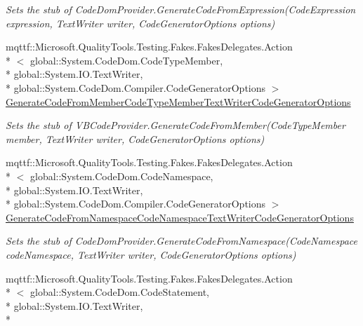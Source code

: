 \begin{DoxyCompactItemize}
\begin{DoxyCompactList}\small\item\em Sets the stub of Code\-Dom\-Provider.\-Generate\-Code\-From\-Expression(\-Code\-Expression expression, Text\-Writer writer, Code\-Generator\-Options options)\end{DoxyCompactList}\item 
mqttf\-::\-Microsoft.\-Quality\-Tools.\-Testing.\-Fakes.\-Fakes\-Delegates.\-Action\\*
$<$ global\-::\-System.\-Code\-Dom.\-Code\-Type\-Member, \\*
global\-::\-System.\-I\-O.\-Text\-Writer, \\*
global\-::\-System.\-Code\-Dom.\-Compiler.\-Code\-Generator\-Options $>$ \hyperlink{class_microsoft_1_1_visual_basic_1_1_fakes_1_1_stub_v_b_code_provider_ac8b0829b524976d97faac50f18757dbd}{Generate\-Code\-From\-Member\-Code\-Type\-Member\-Text\-Writer\-Code\-Generator\-Options}
\begin{DoxyCompactList}\small\item\em Sets the stub of V\-B\-Code\-Provider.\-Generate\-Code\-From\-Member(\-Code\-Type\-Member member, Text\-Writer writer, Code\-Generator\-Options options)\end{DoxyCompactList}\item 
mqttf\-::\-Microsoft.\-Quality\-Tools.\-Testing.\-Fakes.\-Fakes\-Delegates.\-Action\\*
$<$ global\-::\-System.\-Code\-Dom.\-Code\-Namespace, \\*
global\-::\-System.\-I\-O.\-Text\-Writer, \\*
global\-::\-System.\-Code\-Dom.\-Compiler.\-Code\-Generator\-Options $>$ \hyperlink{class_microsoft_1_1_visual_basic_1_1_fakes_1_1_stub_v_b_code_provider_ab595500bfaf18940f5e7a1089ff91a0f}{Generate\-Code\-From\-Namespace\-Code\-Namespace\-Text\-Writer\-Code\-Generator\-Options}
\begin{DoxyCompactList}\small\item\em Sets the stub of Code\-Dom\-Provider.\-Generate\-Code\-From\-Namespace(\-Code\-Namespace code\-Namespace, Text\-Writer writer, Code\-Generator\-Options options)\end{DoxyCompactList}\item 
mqttf\-::\-Microsoft.\-Quality\-Tools.\-Testing.\-Fakes.\-Fakes\-Delegates.\-Action\\*
$<$ global\-::\-System.\-Code\-Dom.\-Code\-Statement, \\*
global\-::\-System.\-I\-O.\-Text\-Writer, \\*

\end{DoxyCompactItemize}
